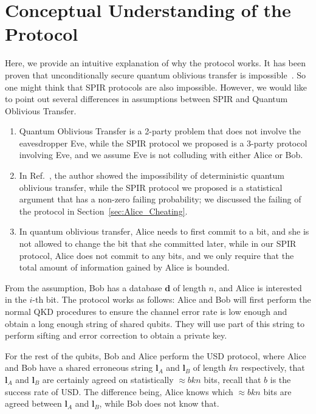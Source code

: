 \documentclass[%
 reprint,
superscriptaddress,
 amsmath,amssymb,
 aps,
]{revtex4-2}
\begin{document}
\section{Conceptual Understanding of the Protocol}

Here, we provide an intuitive explanation of why the protocol works. It has been proven that unconditionally secure quantum oblivious transfer is impossible~\cite{Insecurity_Quantum_Oblivious_transfer1}. So one might think that SPIR protocols are also impossible. However, we would like to point out several differences in assumptions between SPIR and Quantum Oblivious Transfer.

\begin{enumerate}
    \item Quantum Oblivious Transfer is a 2-party problem that does not involve the eavesdropper Eve, while the SPIR protocol we proposed is a 3-party protocol involving Eve, and we assume Eve is not colluding with either Alice or Bob.

    \item In Ref.~\cite{Insecurity_Quantum_Oblivious_transfer1}, the author showed the impossibility of deterministic quantum oblivious transfer, while the SPIR protocol we proposed is a statistical argument that has a non-zero failing probability; we discussed the failing of the protocol in Section~\ref{sec:Alice_Cheating}.

    \item In quantum oblivious transfer, Alice needs to first commit to a bit, and she is not allowed to change the bit that she committed later, while in our SPIR protocol, Alice does not commit to any bits, and we only require that the total amount of information gained by Alice is bounded.
\end{enumerate}

From the assumption, Bob has a database $\mathbf{d}$ of length $n$, and Alice is interested in the $i$-th bit. The protocol works as follows: Alice and Bob will first perform the normal QKD procedures to ensure the channel error rate is low enough and obtain a long enough string of shared qubits. They will use part of this string to perform sifting and error correction to obtain a private key.

For the rest of the qubits, Bob and Alice perform the USD protocol, where Alice and Bob have a shared erroneous string $\mathbf{l}_A$ and $\mathbf{l}_B$ of length $kn$ respectively, that $\mathbf{l}_A$ and $\mathbf{l}_B$ are certainly agreed on statistically $\approx bkn$ bits, recall that $b$ is the success rate of USD. The difference being, Alice knows which $\approx bkn$ bits are agreed between $\mathbf{l}_A$ and $\mathbf{l}_B$, while Bob does not know that.
\end{document}
